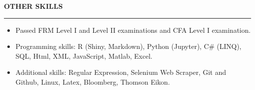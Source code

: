 \documentclass[a4paper,12pt]{report}
\begin{document}
 \par
\vspace{9pt}





\noindent 
\textbf{OTHER SKILLS} \par
\vspace{2pt}
\hrule
\vspace{6pt}
\noindent 
\begin{itemize}[noitemsep,topsep=0pt]
\item {\fontsize{10pt}{10pt}\selectfont Passed FRM Level I and Level II examinations and CFA Level I examination.} \par
\noindent 
\item {\fontsize{10pt}{10pt}\selectfont Programming skills: R (Shiny, Markdown), Python (Jupyter), C\# (LINQ), SQL, Html, XML, JavaScript, Matlab, Excel. } \par
\noindent 
\item {\fontsize{10pt}{10pt}\selectfont Additional skills: Regular Expression, Selenium Web Scraper, Git and Github, Linux, Latex, Bloomberg, Thomson Eikon.}\end{itemize}
 \par
\end{document}
